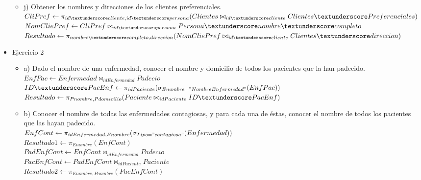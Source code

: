 \documentclass{article}
\begin{document}
\begin{itemize}
\begin{itemize}
        \item j) Obtener los nombres y direcciones de los clientes preferenciales. \\
        $CliPref \leftarrow \pi_{id\textunderscore cliente, id\textunderscore persona} (Clientes \bowtie_{id\textunderscore cliente} Clientes\textunderscore Preferenciales)$ \\
        $NomCliePref \leftarrow CliPref \bowtie_{id\textunderscore persona} Persona\textunderscore nombre\textunderscore completo$ \\
        $Resultado \leftarrow \pi_{nombre\textunderscore completo, direccion} (NomCliePref \bowtie_{id\textunderscore cliente} Clientes\textunderscore direccion)$ \\
        
    \end{itemize}

    \item Ejercicio 2
    \begin{itemize}
        \item a) Dado el nombre de una enfermedad, conocer el nombre y domicilio de todos los pacientes que la han padecido. \\
        $EnfPac \leftarrow Enfermedad \bowtie_{idEnfermedad} Padecio$ \\
        $ID\textunderscore PacEnf \leftarrow \pi_{idPaciente}(\sigma_{Enombre = "NombreEnfermedad"}(EnfPac))$ \\
        $Resultado \leftarrow \pi_{Pnombre, Pdomicilio} (Paciente \bowtie_{idPaciente} ID\textunderscore PacEnf)$ \\

        \item b) Conocer el nombre de todas las enfermedades contagiosas, y para cada una de éstas, conocer el nombre de todos los pacientes que las hayan padecido. \\
        $EnfCont \leftarrow \pi_{idEnfermedad, Enombre} (\sigma_{Tipo = "contagiosa"}(Enfermedad))$ \\
        $Resultado1 \leftarrow \pi_{Enombre} (EnfCont)$ \\
        $PadEnfCont \leftarrow EnfCont \bowtie_{idEnfermedad} Padecio$ \\
        $PacEnfCont \leftarrow PadEnfCont \bowtie_{idPaciente} Paciente$ \\
        $Resultado2 \leftarrow \pi_{Enombre, Pnombre} (PacEnfCont)$ \\


\end{itemize}
\end{itemize}
\end{document}
